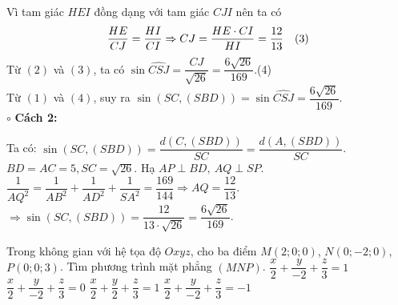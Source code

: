 \begin{ex}
{Vì tam giác $HEI$ đồng dạng với tam giác $CJI$ nên ta có
\begin{equation*}
	\dfrac{HE}{CJ}=\dfrac{HI}{CI}\Rightarrow CJ=\dfrac{HE \cdot CI}{HI}=\dfrac{12}{13} \quad \hfill(3)
\end{equation*}
Từ $(2)$ và $(3)$, ta có $\sin \widehat{CSJ}=\dfrac{CJ}{\sqrt{26}}=\dfrac{6\sqrt{26}}{169}$.\hfill(4)
\\
Từ $(1)$ và $(4)$, suy ra $\sin \left(SC,(SBD)\right)=\sin \widehat{CSJ}=\dfrac{6\sqrt{26}}{169}.$\\
$\circ $ \textbf{Cách 2:}\\
\begin{center}
\end{center}
Ta có: $\sin \left(SC,(SBD)\right)=\dfrac{d\left(C,(SBD)\right)}{SC}=\dfrac{d\left(A,(SBD)\right)}{SC}$.\\
$BD=AC=5, SC=\sqrt{26}$. Hạ $AP\perp BD,\ AQ\perp SP$.\\
$\dfrac{1}{AQ^2}=\dfrac{1}{AB^2}+\dfrac{1}{AD^2}+\dfrac{1}{SA^2}=\dfrac{169}{144}\Rightarrow AQ=\dfrac{12}{13}$.\\
$\Rightarrow \sin \left(SC,(SBD)\right)=\dfrac{12}{13\cdot \sqrt{26}}=\dfrac{6\sqrt{26}}{169}$.
}
\end{ex}
\begin{ex}%
	Trong không gian với hệ tọa độ $Oxyz$, cho ba điểm $M(2;0;0)$, $N(0;-2;0)$, $P(0;0;3)$. Tìm phương trình mặt phẳng $(MNP)$.
	\choice
	{\True $\dfrac{x}{2}+\dfrac{y}{-2}+\dfrac{z}{3}=1$}
	{$\dfrac{x}{2}+\dfrac{y}{-2}+\dfrac{z}{3}=0$}
	{$\dfrac{x}{2}+\dfrac{y}{2}+\dfrac{z}{3}=1$}
	{$\dfrac{x}{2}+\dfrac{y}{-2}+\dfrac{z}{3}=-1$}
\end{ex}

